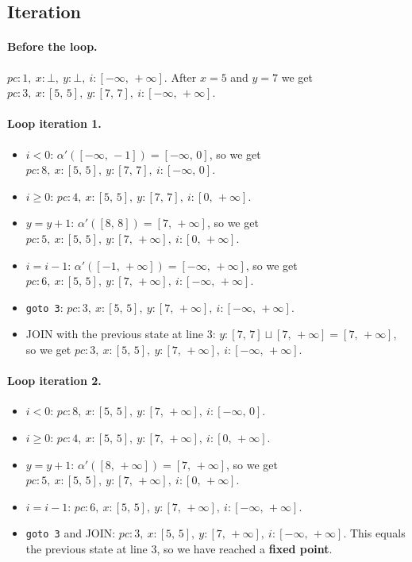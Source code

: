 \documentclass[11pt,a4paper]{article}
\newcommand{\sti}[4]{$\mathit{pc}\colon #1,\allowbreak\ x\colon #2,\allowbreak\ y\colon #3,\allowbreak\ i\colon #4$}
\newcommand{\itv}[2]{[#1,\,#2]}
\newcommand{\ninf}{-\infty}
\newcommand{\pinf}{+\infty}
\begin{document}
\subsection*{Iteration}

\paragraph{Before the loop.}
\sti{1}{\bot}{\bot}{\itv{\ninf}{\pinf}}. After $x = 5$ and $y = 7$ we get
\sti{3}{\itv{5}{5}}{\itv{7}{7}}{\itv{\ninf}{\pinf}}.

\paragraph{Loop iteration 1.}
\begin{itemize}
  \item $i < 0$: $\alpha'(\itv{\ninf}{-1}) = \itv{\ninf}{0}$, so we get
        \sti{8}{\itv{5}{5}}{\itv{7}{7}}{\itv{\ninf}{0}}.
  \item $i \ge 0$: \sti{4}{\itv{5}{5}}{\itv{7}{7}}{\itv{0}{\pinf}}.
  \item $y = y + 1$: $\alpha'(\itv{8}{8}) = \itv{7}{\pinf}$, so we get
        \sti{5}{\itv{5}{5}}{\itv{7}{\pinf}}{\itv{0}{\pinf}}.
  \item $i = i - 1$: $\alpha'(\itv{-1}{\pinf}) = \itv{\ninf}{\pinf}$, so we get
        \sti{6}{\itv{5}{5}}{\itv{7}{\pinf}}{\itv{\ninf}{\pinf}}.
  \item \texttt{goto 3}: \sti{3}{\itv{5}{5}}{\itv{7}{\pinf}}{\itv{\ninf}{\pinf}}.
  \item JOIN with the previous state at line 3: $y\colon \itv{7}{7} \sqcup \itv{7}{\pinf} = \itv{7}{\pinf}$,
        so we get \sti{3}{\itv{5}{5}}{\itv{7}{\pinf}}{\itv{\ninf}{\pinf}}.
\end{itemize}

\paragraph{Loop iteration 2.}
\begin{itemize}
  \item $i < 0$: \sti{8}{\itv{5}{5}}{\itv{7}{\pinf}}{\itv{\ninf}{0}}.
  \item $i \ge 0$: \sti{4}{\itv{5}{5}}{\itv{7}{\pinf}}{\itv{0}{\pinf}}.
  \item $y = y + 1$: $\alpha'(\itv{8}{\pinf}) = \itv{7}{\pinf}$, so we get
        \sti{5}{\itv{5}{5}}{\itv{7}{\pinf}}{\itv{0}{\pinf}}.
  \item $i = i - 1$: \sti{6}{\itv{5}{5}}{\itv{7}{\pinf}}{\itv{\ninf}{\pinf}}.
  \item \texttt{goto 3} and JOIN: \sti{3}{\itv{5}{5}}{\itv{7}{\pinf}}{\itv{\ninf}{\pinf}}.
        This equals the previous state at line 3, so we have reached a \textbf{fixed point}.
\end{itemize}
\end{document}
